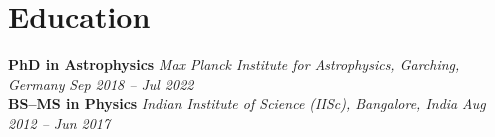 \documentclass[a4paper,10pt]{article}
\begin{document}
\vspace*{-2mm}

\section*{Education}

\textcolor{sectionblue}{\textbf{PhD in Astrophysics}} \hfill
\textit{Max Planck Institute for Astrophysics, Garching, Germany} \hfill
\textit{Sep 2018 -- Jul 2022}\\
\vspace{-1.5mm}
\textcolor{sectionblue}{\textbf{BS--MS in Physics}} \hfill
\textit{Indian Institute of Science (IISc), Bangalore, India} \hfill
\textit{Aug 2012 -- Jun 2017}
\end{document}
